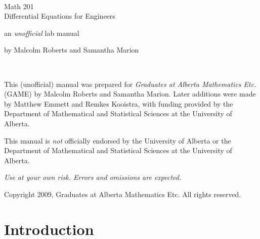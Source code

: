 \documentclass[12pt]{book}
\begin{document}

\pagestyle{empty}

\begin{center}
  \ \vspace{1in}

  \textsf{\LARGE Math 201} \\
  \vspace{0.2in}
  \textsf{\LARGE Differential Equations for Engineers}
  \vspace{2in}

  \textsf{\Huge an \emph{unofficial} lab manual}
  \vspace{2.5in}

by Malcolm Roberts and Samantha Marion
\vspace{0.5in}

\end{center}

\newpage

\ \vspace{5in}

\noindent
This (unofficial) manual was prepared for \emph{Graduates at Alberta
  Mathematics Etc.} (GAME) by Malcolm Roberts and Samantha Marion.
Later additions were made by Matthew Emmett and Remkes Kooistra, with
funding provided by the Department of Mathematical and Statistical
Sciences at the University of Alberta.
\vspace{0.5in}

\noindent
This manual is \emph{not} officially endorsed by the University of
Alberta or the Department of Mathematical and Statistical Sciences at
the University of Alberta.
\vspace{0.5in}

\noindent
\emph{Use at your own risk.  Errors and omissions are expected.}
\vspace{0.5in}

\noindent
Copyright 2009, Graduates at Alberta Mathematics Etc.  All rights
reserved.


\newpage
\pagestyle{plain}

\section*{Introduction}
\end{document}
